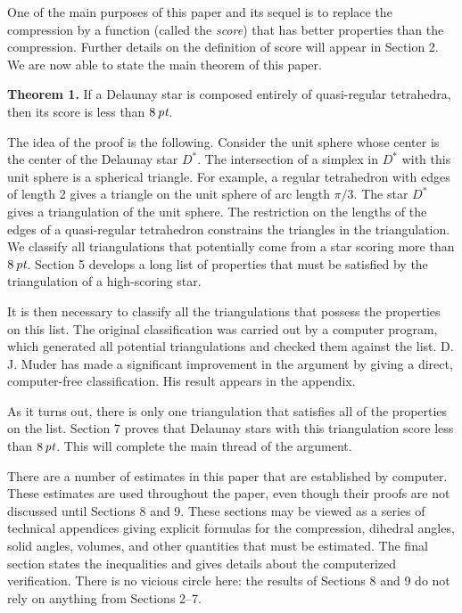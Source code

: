 One of the main purposes
of this paper and its sequel is to replace the compression by
a function (called the {\it score}) that has better properties
than the compression.  
Further details on the definition of score will appear in Section 2.
We are now able to state the main theorem of this paper. 

\bigskip
{\bf Theorem 1.}  If a Delaunay star is composed entirely of quasi-regular
tetrahedra, then its score is less than $8\,\hbox{\it pt}$.
\bigskip

The idea of the proof is the following.  Consider the unit sphere
whose center is the center 
of the Delaunay star $D^*$.  The intersection of a simplex
in $D^*$ with this unit sphere is a spherical triangle.  
For example,
a regular tetrahedron with edges of length 2
gives a triangle on the unit sphere of arc
length $\pi/3$.  
The star
$D^*$ gives a triangulation of the unit sphere.  
The restriction
on the lengths of the edges of a quasi-regular tetrahedron
constrains the triangles
in the triangulation.
We classify all triangulations that potentially come from a star
scoring more than $8\,\hbox{\it pt}$.
Section 5 develops
a long list of properties that must be satisfied by 
the triangulation of a high-scoring star.

It is then necessary to classify all the triangulations that possess
the properties on this list.
The original classification was carried
out by a computer program, which generated all
potential triangulations and checked them against the list.
D. J. Muder has made a significant improvement in the argument by giving
a direct, computer-free classification.  
His result appears in the appendix.


As it turns out, there is only one triangulation that satisfies all
of the properties on the list.  Section 7 proves that 
Delaunay stars with this triangulation
score less than $8\,\hbox{\it pt}$.  This will complete the main
thread of the argument.

There are a number of
estimates in this paper that are established by computer.  These
estimates are used throughout the paper, even though their proofs
are not discussed until Sections 8 and 9.
These sections may be viewed as a series of technical appendices
giving explicit formulas for the compression, dihedral angles,
solid angles, volumes, and other quantities that must be estimated.
The final section states the inequalities and gives
details about the computerized verification.
There is no vicious
circle here:  the results of Sections 8 and 9 do not
rely on anything from Sections 2--7.

